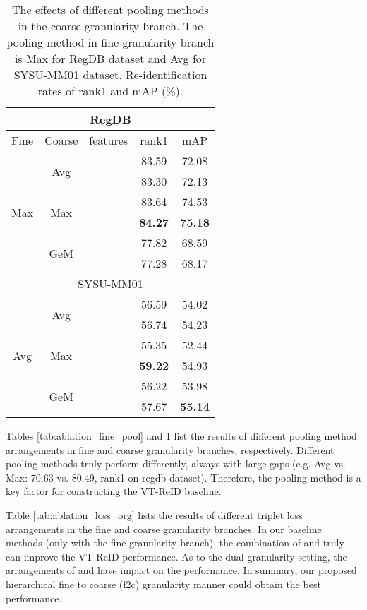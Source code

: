 \documentclass[journal]{IEEEtran}
\begin{document}
\begin{table}
\scriptsize
\caption{The effects of different pooling methods in the coarse granularity branch. The pooling method in fine granularity branch is Max for RegDB dataset and Avg for SYSU-MM01 dataset.  Re-identification rates of rank1 and mAP (\%).}
\label{tab:ablation_coarse_pool}
  \centering
  \setlength{\tabcolsep}{0.5cm}
  \begin{tabular}{c|c|c|c|c}
   \toprule[2pt]
      \multicolumn{5}{c}{RegDB} \\ \hline
    Fine & Coarse & features & rank1 & mAP    \\ \toprule[1pt]
   \multirow{6}{*}{Max} & \multirow{2}{*}{Avg} &  & 83.59 & 72.08 \\
                       &  &  & 83.30 & 72.13  \\ \cline{2-5}
    &\multirow{2}{*}{Max} &  & 83.64 & 74.53  \\
                        & &  & \textbf{84.27} & \textbf{75.18}  \\ \cline{2-5}
    &\multirow{2}{*}{GeM} &  & 77.82 & 68.59  \\
                        & &  & 77.28 & 68.17  \\ \toprule[1pt] \toprule[1pt]
       \multicolumn{5}{c}{SYSU-MM01} \\ \hline
   \multirow{6}{*}{Avg} & \multirow{2}{*}{Avg} &  & 56.59 & 54.02 \\
                       &  &  &  56.74 & 54.23 \\ \cline{2-5}
    &\multirow{2}{*}{Max} &  & 55.35 & 52.44  \\
                        & &  & \textbf{59.22} &  54.93 \\ \cline{2-5}
    &\multirow{2}{*}{GeM} &  & 56.22 & 53.98  \\
                        & &  & 57.67 & \textbf{55.14}  \\
     \toprule[2pt]
  \end{tabular}
\end{table}

Tables \ref{tab:ablation_fine_pool} and \ref{tab:ablation_coarse_pool} list the results of different pooling method arrangements in fine and coarse granularity branches, respectively. Different pooling methods truly perform differently, always with large gaps (e.g. Avg vs. Max: 70.63 vs. 80.49, rank1 on regdb dataset). Therefore, the pooling method is a key factor for constructing the VT-ReID baseline.

Table \ref{tab:ablation_loss_org} lists the results of different triplet loss arrangements in the fine and coarse granularity branches. In our baseline methods (only with the fine granularity branch), the combination of  and  truly can improve the VT-ReID performance. As to the dual-granularity setting, the arrangements of  and  have impact on the performance. In summary, our proposed hierarchical fine to coarse (f2c) granularity manner could obtain the best performance.
\end{document}
